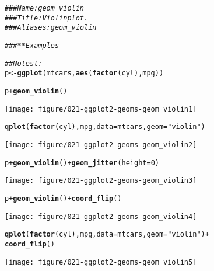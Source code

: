 \documentclass[a4paper,titlepage]{tufte-handout}\usepackage[]{graphicx}\usepackage[]{color}
\makeatletter
\def\maxwidth{ %
  \ifdim\Gin@nat@width>\linewidth
    \linewidth
  \else
    \Gin@nat@width
  \fi
}
\newcommand{\hlnum}[1]{\textcolor[rgb]{0.686,0.059,0.569}{#1}}%
\newcommand{\hlstr}[1]{\textcolor[rgb]{0.192,0.494,0.8}{#1}}%
\newcommand{\hlcom}[1]{\textcolor[rgb]{0.678,0.584,0.686}{\textit{#1}}}%
\newcommand{\hlopt}[1]{\textcolor[rgb]{0,0,0}{#1}}%
\newcommand{\hlstd}[1]{\textcolor[rgb]{0.345,0.345,0.345}{#1}}%
\newcommand{\hlkwb}[1]{\textcolor[rgb]{0.69,0.353,0.396}{#1}}%
\newcommand{\hlkwc}[1]{\textcolor[rgb]{0.333,0.667,0.333}{#1}}%
\newcommand{\hlkwd}[1]{\textcolor[rgb]{0.737,0.353,0.396}{\textbf{#1}}}%
\newenvironment{kframe}{%
 \def\at@end@of@kframe{}%
 \ifinner\ifhmode%
  \def\at@end@of@kframe{\end{minipage}}%
  \begin{minipage}{\columnwidth}%
 \fi\fi%
 \def\FrameCommand##1{\hskip\@totalleftmargin \hskip-\fboxsep
 \colorbox{shadecolor}{##1}\hskip-\fboxsep
     \hskip-\linewidth \hskip-\@totalleftmargin \hskip\columnwidth}%
 \MakeFramed {\advance\hsize-\width
   \@totalleftmargin\z@ \linewidth\hsize
   \@setminipage}}%
 {\par\unskip\endMakeFramed%
 \at@end@of@kframe}
\newenvironment{knitrout}{}{} %
\makeatother
\begin{document}
\begin{knitrout}
\color{fgcolor}\begin{kframe}
\begin{alltt}
\hlcom{### Name: geom_violin}
\hlcom{### Title: Violin plot.}
\hlcom{### Aliases: geom_violin}

\hlcom{### ** Examples}

\hlcom{## No test: }
\hlstd{p} \hlkwb{<-} \hlkwd{ggplot}\hlstd{(mtcars,} \hlkwd{aes}\hlstd{(}\hlkwd{factor}\hlstd{(cyl), mpg))}

\hlstd{p} \hlopt{+} \hlkwd{geom_violin}\hlstd{()}
\end{alltt}
\end{kframe}
\texttt{[image: figure/021-ggplot2-geoms-geom\_violin1]} 
\begin{kframe}\begin{alltt}
\hlkwd{qplot}\hlstd{(}\hlkwd{factor}\hlstd{(cyl), mpg,} \hlkwc{data} \hlstd{= mtcars,} \hlkwc{geom} \hlstd{=} \hlstr{"violin"}\hlstd{)}
\end{alltt}
\end{kframe}
\texttt{[image: figure/021-ggplot2-geoms-geom\_violin2]} 
\begin{kframe}\begin{alltt}
\hlstd{p} \hlopt{+} \hlkwd{geom_violin}\hlstd{()} \hlopt{+} \hlkwd{geom_jitter}\hlstd{(}\hlkwc{height} \hlstd{=} \hlnum{0}\hlstd{)}
\end{alltt}
\end{kframe}
\texttt{[image: figure/021-ggplot2-geoms-geom\_violin3]} 
\begin{kframe}\begin{alltt}
\hlstd{p} \hlopt{+} \hlkwd{geom_violin}\hlstd{()} \hlopt{+} \hlkwd{coord_flip}\hlstd{()}
\end{alltt}
\end{kframe}
\texttt{[image: figure/021-ggplot2-geoms-geom\_violin4]} 
\begin{kframe}\begin{alltt}
\hlkwd{qplot}\hlstd{(}\hlkwd{factor}\hlstd{(cyl), mpg,} \hlkwc{data} \hlstd{= mtcars,} \hlkwc{geom} \hlstd{=} \hlstr{"violin"}\hlstd{)} \hlopt{+}
  \hlkwd{coord_flip}\hlstd{()}
\end{alltt}
\end{kframe}
\texttt{[image: figure/021-ggplot2-geoms-geom\_violin5]} 
\begin{kframe}\begin{alltt}

\end{alltt}
\end{kframe}
\end{knitrout}
\end{document}
